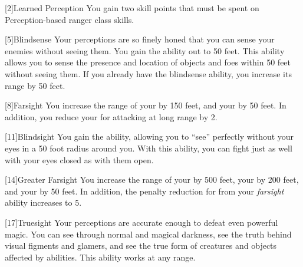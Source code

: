         [2]{Learned Perception} You gain two skill points that must be spent on Perception-based ranger class skills.

        [5]{Blindsense}
        Your perceptions are so finely honed that you can sense your enemies without seeing them.
        You gain the  ability out to 50 feet.
        This ability allows you to sense the presence and location of objects and foes within 50 feet without seeing them.
        If you already have the blindsense ability, you increase its range by 50 feet.

        [8]{Farsight}
        You increase the range of your  by 150 feet, and your  by 50 feet.
        In addition, you reduce your  for attacking at long range by 2.

        [11]{Blindsight}
        You gain the  ability, allowing you to ``see'' perfectly without your eyes in a 50 foot radius around you.
        With this ability, you can fight just as well with your eyes closed as with them open.

        [14]{Greater Farsight}
        You increase the range of your  by 500 feet, your  by 200 feet, and your  by 50 feet.
        In addition, the penalty reduction for  from your \textit{farsight} ability increases to 5.

        [17]{Truesight} 
        Your perceptions are accurate enough to defeat even powerful magic.
        You can see through normal and magical darkness, see the truth behind visual figments and glamers, and see the true form of creatures and objects affected by  abilities.
        This ability works at any range.

